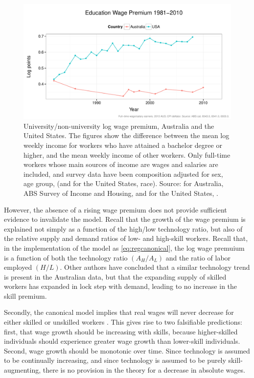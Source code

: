 \begin{figure}
  \centering
  \includegraphics[width=\textwidth]{../figure/ed_premium_time_two.pdf}
  \caption{University/non-university log wage premium, Australia and the United States. The figures show the difference between the mean log weekly income for workers who have attained a bachelor degree or higher, and the mean weekly income of other workers. Only full-time workers whose main sources of income are wages and salaries are included, and survey data have been composition adjusted for sex, age group, (and for the United States, race). Source: for Australia, ABS Survey of Income and Housing, and for the United States, \citet{Acemoglu2011}.}
  \label{fig:wagepremium}
\end{figure}

However, the absence of a rising wage premium does not provide sufficient evidence to invalidate the model. Recall that the growth of the wage premium is explained not simply as a function of the high/low technology ratio, but also of the relative supply and demand ratios of low- and high-skill workers. Recall that, in the \citet{Katz1992} implementation of the model as \eqref{eq:regcanonical}, the log wage premuium is a function of both the technology ratio $(A_H/A_L)$ and the ratio of labor employed $(H/L)$. Other authors have concluded that a similar technology trend is present in the Australian data, but that the expanding supply of skilled workers has expanded in lock step with demand, leading to no increase in the skill premium.

Secondly, the canonical model implies that real wages will never decrease for either skilled or unskilled workers \citep{Acemoglu2011}. This gives rise to two falsifiable predictions: first, that wage growth should be increasing with skills, because higher-skilled individuals should experience greater wage growth than lower-skill individuals. Second, wage growth should be monotonic over time. Since technology is assumed to be continually increasing, and since technology is assumed to be purely skill-augmenting, there is no provision in the theory for a decrease in absolute wages.

